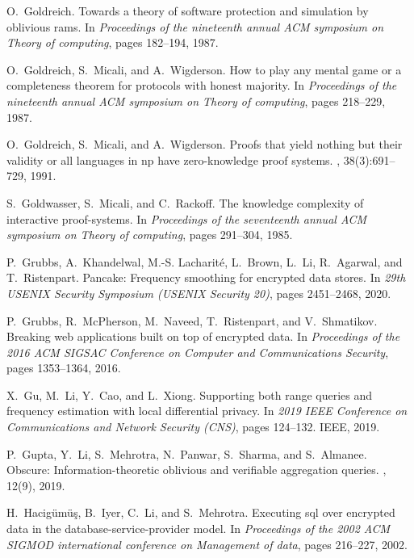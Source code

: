 \documentclass[11pt]{article}
\begin{document}
\begin{thebibliography}{140}
\begin{small}
O.~Goldreich.
\newblock Towards a theory of software protection and simulation by oblivious
  rams.
\newblock In {\em Proceedings of the nineteenth annual ACM symposium on Theory
  of computing}, pages 182--194, 1987.

O.~Goldreich, S.~Micali, and A.~Wigderson.
\newblock How to play any mental game or a completeness theorem for protocols
  with honest majority.
\newblock In {\em Proceedings of the nineteenth annual ACM symposium on Theory
  of computing}, pages 218--229, 1987.

O.~Goldreich, S.~Micali, and A.~Wigderson.
\newblock Proofs that yield nothing but their validity or all languages in np
  have zero-knowledge proof systems.
, 38(3):691--729, 1991.

S.~Goldwasser, S.~Micali, and C.~Rackoff.
\newblock The knowledge complexity of interactive proof-systems.
\newblock In {\em Proceedings of the seventeenth annual ACM symposium on Theory
  of computing}, pages 291--304, 1985.

P.~Grubbs, A.~Khandelwal, M.-S. Lacharité, L.~Brown, L.~Li, R.~Agarwal, and
  T.~Ristenpart.
\newblock Pancake: Frequency smoothing for encrypted data stores.
\newblock In {\em 29th USENIX Security Symposium (USENIX Security 20)}, pages
  2451--2468, 2020.

P.~Grubbs, R.~McPherson, M.~Naveed, T.~Ristenpart, and V.~Shmatikov.
\newblock Breaking web applications built on top of encrypted data.
\newblock In {\em Proceedings of the 2016 ACM SIGSAC Conference on Computer and
  Communications Security}, pages 1353--1364, 2016.

X.~Gu, M.~Li, Y.~Cao, and L.~Xiong.
\newblock Supporting both range queries and frequency estimation with local
  differential privacy.
\newblock In {\em 2019 IEEE Conference on Communications and Network Security
  (CNS)}, pages 124--132. IEEE, 2019.

P.~Gupta, Y.~Li, S.~Mehrotra, N.~Panwar, S.~Sharma, and S.~Almanee.
\newblock Obscure: Information-theoretic oblivious and verifiable aggregation
  queries.
, 12(9), 2019.

H.~Hacig{\"u}m{\"u}{\c{s}}, B.~Iyer, C.~Li, and S.~Mehrotra.
\newblock Executing sql over encrypted data in the database-service-provider
  model.
\newblock In {\em Proceedings of the 2002 ACM SIGMOD international conference
  on Management of data}, pages 216--227, 2002.


\end{small}
\end{thebibliography}
\end{document}
